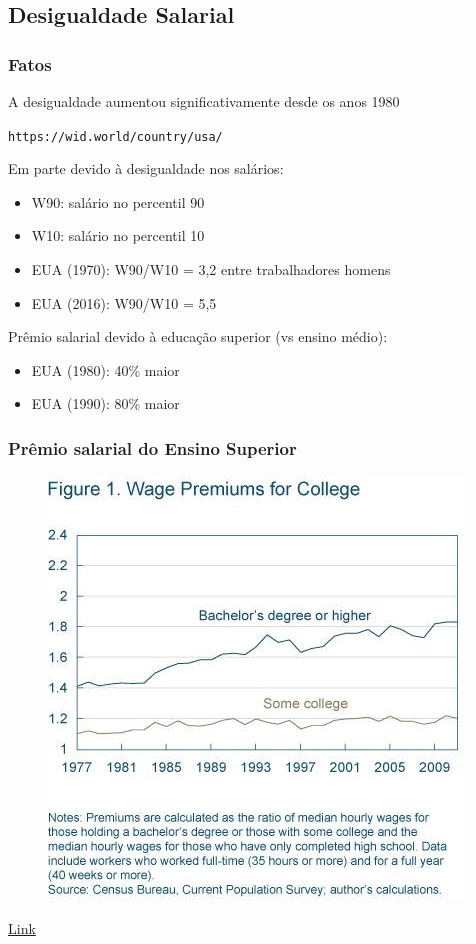 \documentclass[a4paper,12pt]{article}[abntex2]
\begin{document}
\subsection{\textbf{Desigualdade Salarial}}
\subsubsection{\textbf{Fatos}}
A desigualdade aumentou significativamente desde os anos 1980

\texttt{https://wid.world/country/usa/}

Em parte devido à desigualdade nos salários:
\begin{itemize}
    \item W90: salário no percentil 90
    \item W10: salário no percentil 10
    \item EUA (1970): W90/W10 = 3{,}2 entre trabalhadores homens
    \item EUA (2016): W90/W10 = 5{,}5
\end{itemize}

Prêmio salarial devido à educação superior (vs ensino médio):
\begin{itemize}
    \item EUA (1980): 40\% maior
    \item EUA (1990): 80\% maior
\end{itemize}


\subsubsection{\textbf{Prêmio salarial do Ensino Superior}}
\begin{figure}[H]
    \centering
    \includegraphics[width=0.7\linewidth]{Imagens/a13i7.png}
\end{figure}
\href{https://www.clevelandfed.org/newsroom-and-events/publications/economic-commentary/economic-commentary-archives/2012-economic-commentaries/ec-201210-the-college-wage-premium.aspx}{Link}
\end{document}
